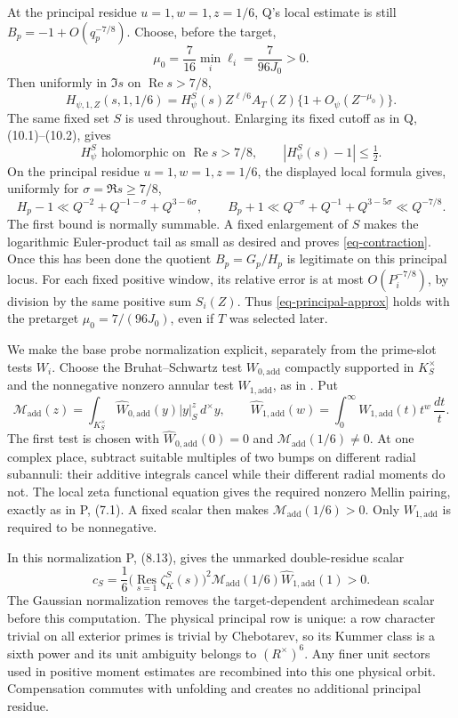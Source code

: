 \documentclass[11pt,a4paper]{article}
\theoremstyle{remark}\newtheorem{remark}[theorem]{Remark}
\newcommand{\Rea}{\operatorname{Re}}
\numberwithin{equation}{section}
\begin{document}
At the principal residue $u=1,w=1,z=1/6$, Q's local estimate
is still $B_p=-1+O(q_p^{-7/8})$. Choose, before the target,
\[
 \mu_0=\frac7{16}\min_i\ell_i=\frac7{96J_0}>0.
\]
Then uniformly in $\Im s$ on $\Rea s>7/8$,
\begin{equation}\label{eq-principal-approx}
 H_{\psi,1,Z}(s,1,1/6)
   =H_\psi^S(s)Z^{\ell/6}A_T(Z)
        \{1+O_\psi(Z^{-\mu_0})\}.
\end{equation}
The same fixed set $S$ is used throughout. Enlarging its fixed
cutoff as in Q, (10.1)--(10.2), gives
\begin{equation}\label{eq-contraction}
 H_\psi^S\text{ holomorphic on }\Rea s>7/8,
 \qquad |H_\psi^S(s)-1|\le\tfrac12.
\end{equation}
On the principal residue $u=1,w=1,z=1/6$, the displayed local formula
gives, uniformly for $\sigma=\Re s\ge7/8$,
\[
 H_p-1\ll Q^{-2}+Q^{-1-\sigma}+Q^{3-6\sigma},\qquad
 B_p+1\ll Q^{-\sigma}+Q^{-1}+Q^{3-5\sigma}
             \ll Q^{-7/8}.
\]
The first bound is normally summable.  A fixed enlargement of $S$
makes the logarithmic Euler-product tail as small as desired and
proves \eqref{eq-contraction}.  Once this has been done the quotient
$B_p=G_p/H_p$ is legitimate on this principal locus.
For each fixed positive window, its relative error is at most
$O(P_i^{-7/8})$, by division by the same positive sum $S_i(Z)$.
Thus \eqref{eq-principal-approx} holds with the pretarget
$\mu_0=7/(96J_0)$, even if $T$ was selected later.

We make the base probe normalization explicit, separately from
the prime-slot tests $W_i$. Choose the Bruhat--Schwartz test
$W_{0,\mathrm{add}}$ compactly supported in $K_S^\times$ and the
nonnegative nonzero annular test $W_{1,\mathrm{add}}$, as in
\cite[(7.1)--(7.3)]{P}. Put
\[
 \mathcal M_{\mathrm{add}}(z)
 =\int_{K_S^\times}\widehat W_{0,\mathrm{add}}(y)
                          |y|_S^z\,d^\times y,
 \qquad
 \widehat W_{1,\mathrm{add}}(w)
 =\int_0^\infty W_{1,\mathrm{add}}(t)t^w\,\frac{dt}{t}.
\]
The first test is chosen with
$\widehat W_{0,\mathrm{add}}(0)=0$ and
$\mathcal M_{\mathrm{add}}(1/6)\ne0$.
At one complex place, subtract suitable multiples of two bumps
on different radial subannuli: their additive integrals cancel
while their different radial moments do not. The local zeta
functional equation gives the required nonzero Mellin pairing,
exactly as in P, (7.1). A fixed scalar then makes
$\mathcal M_{\mathrm{add}}(1/6)>0$.
Only $W_{1,\mathrm{add}}$ is required to be nonnegative.

In this normalization P, (8.13), gives the unmarked double-residue
scalar
\[
 c_S=\frac16\bigl(\operatorname*{Res}_{s=1}\zeta_K^S(s)\bigr)^2
         \mathcal M_{\mathrm{add}}(1/6)
         \widehat W_{1,\mathrm{add}}(1)>0.
\]
The Gaussian normalization removes the target-dependent
archimedean scalar before this computation. The physical principal
row is unique: a row character trivial on all exterior primes is
trivial by Chebotarev, so its Kummer class is a sixth power and
its unit ambiguity belongs to $(R^\times)^6$. Any finer unit
sectors used in positive moment estimates are recombined into
this one physical orbit. Compensation commutes with unfolding
and creates no additional principal residue.
\end{document}
